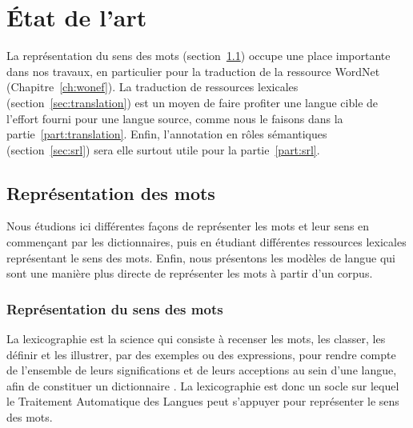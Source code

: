 

\chapter{État de l'art} 
\label{ch:etatdelart} 


La représentation du sens des mots (section~\ref{sec:mots}) occupe une place
importante dans nos travaux, en particulier pour la traduction de la ressource
WordNet (Chapitre~\ref{ch:wonef}). La traduction de ressources lexicales
(section~\ref{sec:translation}) est un moyen de faire profiter une langue cible
de l'effort fourni pour une langue source, comme nous le faisons dans la
partie~\ref{part:translation}. Enfin, l'annotation en rôles sémantiques
(section~\ref{sec:srl}) sera elle surtout utile pour la partie~\ref{part:srl}.

\section{Représentation des mots}
\label{sec:mots}

Nous étudions ici différentes façons de représenter les mots et leur sens en
commençant par les dictionnaires, puis en étudiant différentes ressources
lexicales représentant le sens des mots. Enfin, nous présentons les modèles de
langue qui sont une manière plus directe de représenter les mots à partir d'un
corpus.

\subsection{Représentation du sens des mots}

La lexicographie est la science qui consiste à recenser les mots, les classer,
les définir et les illustrer, par des exemples ou des expressions, pour rendre
compte de l'ensemble de leurs significations et de leurs acceptions au sein
d'une langue, afin de constituer un dictionnaire
\citep{wikipedia2014lexicographie}. La lexicographie est donc un socle sur
lequel le Traitement Automatique des Langues peut s'appuyer pour représenter le
sens des mots.


